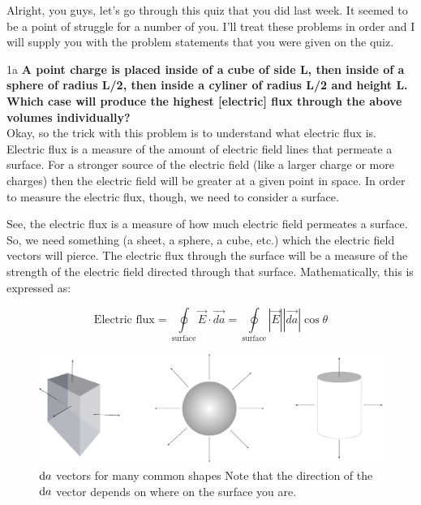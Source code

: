 \begin{homeworkProblem}[Quiz 3, Pr. 1]
        Alright, you guys, let's go through this quiz that you did last
        week. It seemed to be a point of struggle for a number of
        you. I'll treat these problems in order and I will supply you
        with the problem statements that you were given on the quiz.

    \begin{homeworkSection}{1a}
        \textbf{A point charge is placed inside of a cube of side L,
        then inside of a sphere of radius L/2, then inside a cyliner of
        radius L/2 and height L. Which case will produce the highest
        [electric] flux through the above volumes individually?}
        \\

        Okay, so the trick with this problem is to understand what
        electric flux is. Electric flux is a measure of the amount of
        electric field lines that permeate a surface. For a stronger
        source of the electric field (like a larger charge or more
        charges) then the electric field will be greater at a given
        point in space. In order to measure the electric flux, though,
        we need to consider a surface. 
        
        See, the electric flux is a measure of how much electric field
        permeates a surface. So, we need something (a sheet, a sphere, a
        cube, etc.) which the electric field vectors will pierce. The
        electric flux through the surface will be a measure of the
        strength of the electric field directed through that surface.
        Mathematically, this is expressed as:
        
        \[
        \text{Electric flux} = \oint\limits_{\text{surface}}
        \vec{E}\cdot\vec{da} = \oint\limits_{\text{surface}} |\vec{E}|
        |\vec{da}| \cos\theta 
        \]
     
        \begin{figure}[t]
            \centering
            \includegraphics[width=.75\textwidth]{./img/davectors.eps}
            \caption{$\mathop{}\!\mathrm{d} a$ vectors for many common shapes
            Note that the direction of the $\mathop{}\!\mathrm{d} a$ vector
            depends on where on the surface you are.}
            \label{fig:davectors.eps}
        \end{figure}


\end{homeworkSection}
\end{homeworkProblem}
